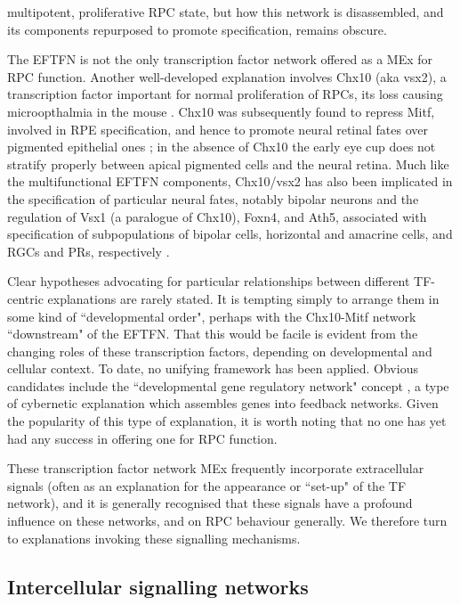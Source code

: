 \documentclass{ut-thesis}
\begin{document}
\begin{NoHyper}
multipotent, proliferative RPC state, but how this network is disassembled, and its components repurposed to promote specification, remains obscure.

The EFTFN is not the only transcription factor network offered as a MEx for RPC function. Another well-developed explanation involves Chx10 (aka vsx2), a transcription factor important for normal proliferation of RPCs, its loss causing microopthalmia in the mouse \cite{Burmeister1996}. Chx10 was subsequently found to repress Mitf, involved in RPE specification, and hence to promote neural retinal fates over pigmented epithelial ones \cite{Horsford2004}; in the absence of Chx10 the early eye cup does not stratify properly between apical pigmented cells and the neural retina. Much like the multifunctional EFTFN components, Chx10/vsx2 has also been implicated in the specification of particular neural fates, notably bipolar neurons \cite{Burmeister1996} and the regulation of Vsx1 (a paralogue of Chx10), Foxn4, and Ath5, associated with specification of subpopulations of bipolar cells, horizontal and amacrine cells, and RGCs and PRs, respectively \cite{Clark2008,Vitorino2009}.

Clear hypotheses advocating for particular relationships between different TF-centric explanations are rarely stated. It is tempting simply to arrange them in some kind of ``developmental order", perhaps with the Chx10-Mitf network ``downstream" of the EFTFN. That this would be facile is evident from the changing roles of these transcription factors, depending on developmental and cellular context. To date, no unifying framework has been applied. Obvious candidates include the ``developmental gene regulatory network" concept \cite{Li2009}, a type of cybernetic explanation which assembles genes into feedback networks. Given the popularity of this type of explanation, it is worth noting that no one has yet had any success in offering one for RPC function.

These transcription factor network MEx frequently incorporate extracellular signals (often as an explanation for the appearance or ``set-up" of the TF network), and it is generally recognised that these signals have a profound influence on these networks, and on RPC behaviour generally. We therefore turn to explanations invoking these signalling mechanisms.

\subsection{Intercellular signalling networks}


\end{NoHyper}
\end{document}
